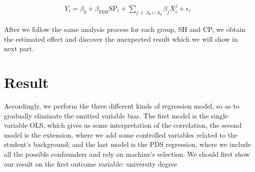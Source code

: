 \documentclass[]{AEA}
\begin{document}
    \begin{align}
        Y_i = \beta_0 + \beta_{\text{PDS}}\text{SP}_i + \sum_{j \,\in\, \Lambda_\theta \cup \Lambda_\eta} \beta_j X_i^j + \epsilon_i
    \end{align}

    After we follow the same analysis process for each group, SH and CP, we obtain the estimated effect and discover the unexpected result which we will show in next part.


\section{Result}

    Accordingly, we perform the three different kinds of regression model, so as to gradually eliminate the omitted variable bias.  The first model is the single variable OLS, which gives us some interpretation of the correlation, the second model is the extension, where we add some controlled variables related to the student's background; and the last model is the PDS regression, where we include all the possible confounders and rely on machine's selection.  We should first show our result on the first outcome variable: university degree
\end{document}
